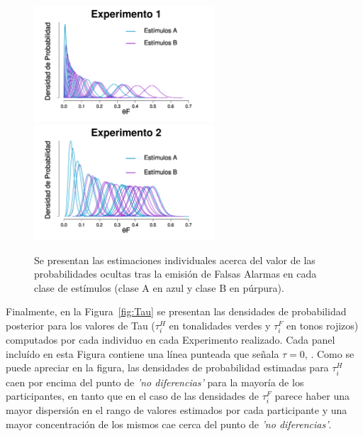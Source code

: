 \begin{figure}[th]
\centering
\includegraphics[width=0.6\textwidth]{Figures/MTau_FA_E1}\\
\includegraphics[width=0.6\textwidth]{Figures/MTau_FA_E2}\\
\caption[Modelo Tau: Inferencias individuales para el valor de la probabilidad de cometer una Falsa Alarma en cada clase de estímulos]{Se presentan las estimaciones individuales acerca del valor de las probabilidades ocultas tras la emisión de Falsas Alarmas en cada clase de estímulos (clase A en azul y clase B en púrpura).}
\label{fig:Tau_FA}
\end{figure}

Finalmente, en la Figura~\ref{fig:Tau} se presentan las densidades de probabilidad posterior para los valores de Tau ($\tau^H_{i}$ en tonalidades verdes y $\tau^F_{i}$ en tonos rojizos) computados por cada individuo en cada Experimento realizado. Cada panel incluído en esta Figura contiene una línea punteada que señala $\tau = 0$,  . Como se puede apreciar en la figura, las densidades de probabilidad estimadas para $\tau^H_{i}$ caen por encima del punto de \textit{'no diferencias'} para la mayoría de los participantes, en tanto que en el caso de las densidades de $\tau^F_{i}$ parece haber una mayor dispersión en el rango de valores estimados por cada participante y una mayor concentración de los mismos cae cerca del punto de \textit{'no diferencias'}.\\

